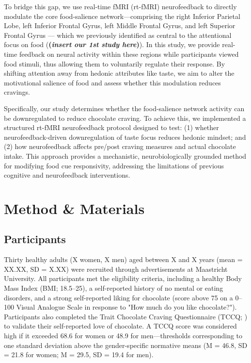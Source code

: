 \documentclass[]{imag-ms-template}
\begin{document}
To bridge this gap, we use real-time fMRI (rt-fMRI) neurofeedback to directly modulate the core food-salience network—comprising the right Inferior Parietal Lobe, left Inferior Frontal Gyrus, left Middle Frontal Gyrus, and left Superior Frontal Gyrus — which we previously identified as central to the attentional focus on food (\textbf{(\textit{insert our 1st study here})}). In this study, we provide real-time feedback on neural activity within these regions while participants viewed food stimuli, thus allowing them to voluntarily regulate their response. By shifting attention away from hedonic attributes like taste, we aim to alter the motivational salience of food and assess whether this modulation reduces cravings.

Specifically, our study determines whether the food-salience network activity can be downregulated to reduce chocolate craving. To achieve this, we implemented a structured rt-fMRI neurofeedback protocol designed to test: (1) whether neurofeedback-driven downregulation of taste focus reduces hedonic mindset; and (2) how neurofeedback affects pre/post craving measures and actual chocolate intake. This approach provides a mechanistic, neurobiologically grounded method for modifying food cue responsivity, addressing the limitations of previous cognitive and neurofeedback interventions.

\newpage

\section{Method \& Materials}

\subsection{Participants}
Thirty healthy adults (X women, X men) aged between X and X years (mean = XX.XX, SD = X.XX) were recruited through advertisements at Maastricht University. All participants met the eligibility criteria, including a healthy Body Mass Index (BMI; 18.5–25), a self-reported history of no mental or eating disorders, and a strong self-reported liking for chocolate (score above 75 on a 0–100 Visual Analogue Scale in response to "How much do you like chocolate?"). Participants also completed the Trait Chocolate Craving Questionnaire (TCCQ; \cite{bentonDevelopmentAttitudesChocolate1998}) to validate their self-reported love of chocolate. A TCCQ score was considered high if it exceeded 68.6 for women or 48.9 for men—thresholds corresponding to one standard deviation above the gender-specific normative means (M = 46.8, SD = 21.8 for women; M = 29.5, SD = 19.4 for men).
\end{document}
